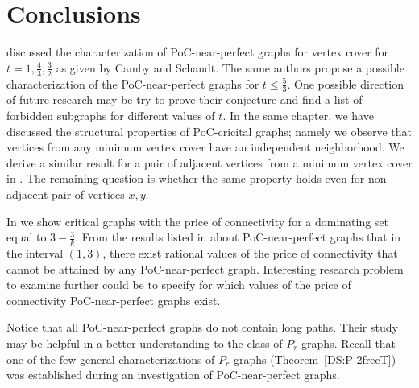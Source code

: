 \section{Conclusions}
 discussed the characterization of PoC-near-perfect graphs for vertex cover for \(t = 1, \frac{4}{3}, \frac{3}{2}\)
as given by Camby and Schaudt. The same authors propose a possible characterization of the PoC-near-perfect graphs for \(t \leq \frac{5}{3}\). 
One possible direction of future research may be try to prove their conjecture and find a list of forbidden subgraphs for different values of \(t\).
In the same chapter, we have discussed the structural properties of PoC-cricital graphs; namely we observe that vertices from any minimum vertex cover have an independent neighborhood.
We derive a similar result for a pair of adjacent vertices from a minimum vertex cover in .
The remaining question is whether the same property holds even for non-adjacent pair of vertices \(x, y\).

In  we show critical graphs with the price of connectivity for a dominating set equal to \(3-\frac{3}{k}\).
From the results listed in  about PoC-near-perfect graphs that in the interval \((1, 3)\), there exist rational values of the price of connectivity that
cannot be attained by any PoC-near-perfect graph. 
Interesting research problem to examine further could be to specify for which values of the price of connectivity 
PoC-near-perfect graphs exist. 

Notice that all PoC-near-perfect graphs do not contain long paths. 
Their study may be helpful in a better understanding to the class of \(P_r\)-graphs.
Recall that one of the few general characterizations of \(P_r\)-graphs (Theorem~\ref{DS:P-2freeT})
was established during an investigation of PoC-near-perfect graphs.
